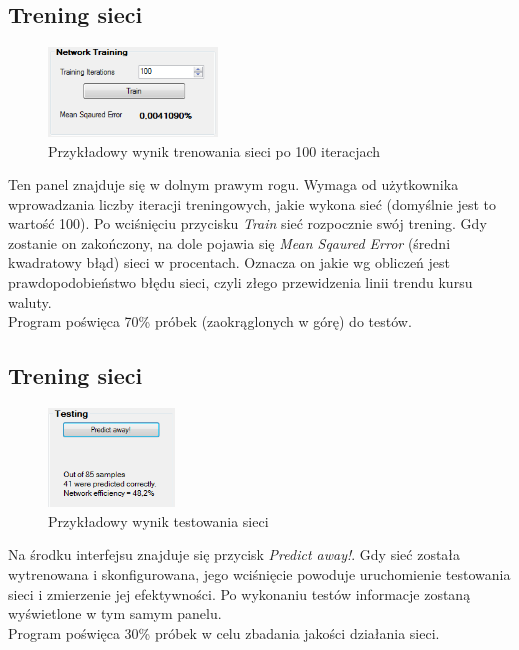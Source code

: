 \documentclass[a4paper]{article}
\begin{document}
			\subsection{Trening sieci}
				\begin{figure}[h!]
					\centering
					\includegraphics[width=0.40\textwidth]{./img/GUI_network_training}
					\caption{Przykładowy wynik trenowania sieci po 100 iteracjach}
				\end{figure}
				Ten panel znajduje się w dolnym prawym rogu. Wymaga od użytkownika wprowadzania liczby iteracji treningowych, jakie wykona sieć (domyślnie jest to wartość 100). Po wciśnięciu przycisku \emph{Train} sieć rozpocznie swój trening. Gdy zostanie on zakończony, na dole pojawia się \emph{Mean Sqaured Error} (średni kwadratowy błąd) sieci w procentach. Oznacza on jakie wg obliczeń jest prawdopodobieństwo błędu sieci, czyli złego przewidzenia linii trendu kursu waluty.\\
				Program poświęca 70\% próbek (zaokrąglonych w górę) do testów.
			\newpage
			\subsection{Trening sieci}
				\begin{figure}[h!]
					\centering
					\includegraphics[width=0.30\textwidth]{./img/GUI_testing}
					\caption{Przykładowy wynik testowania sieci}
				\end{figure}
				Na środku interfejsu znajduje się przycisk \emph{Predict away!}. Gdy sieć została wytrenowana i skonfigurowana, jego wciśnięcie powoduje uruchomienie testowania sieci i zmierzenie jej efektywności. Po wykonaniu testów informacje zostaną wyświetlone w tym samym panelu.\\ Program poświęca 30\% próbek w celu zbadania jakości działania sieci.
\end{document}

